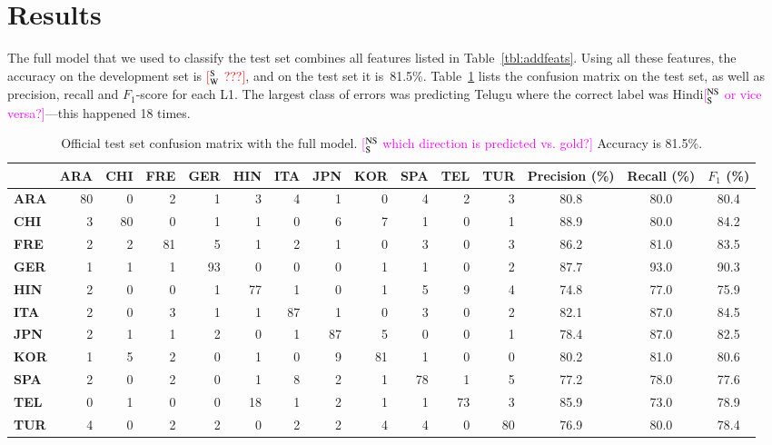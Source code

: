 \documentclass[11pt,letterpaper]{article}
\newcommand{\ensuretext}[1]{#1}
\newcommand{\nssmarker}{\ensuretext{\textcolor{magenta}{\ensuremath{^{\textsc{NS}}_{\textsc{S}}}}}}
\newcommand{\swmarker}{\ensuretext{\textcolor{red}{\ensuremath{^{\textsc{S}}_{\textsc{W}}}}}}
\newcommand{\arkcomment}[3]{\ensuretext{\textcolor{#3}{[#1 #2]}}}
\newcommand{\nss}[1]{\arkcomment{\nssmarker}{#1}{magenta}}
\newcommand{\sw}[1]{\arkcomment{\swmarker}{#1}{red}}
\newcommand{\Tref}[1]{Table~\ref{#1}}
\begin{document}
\section{Results}
\label{sec:results}
The full model that we used to classify the test set combines all
features listed in \Tref{tbl:addfeats}. Using all these features, the
accuracy on the development set is \sw{???}, and on the test set it
is~81.5\%. \Tref{tbl:matrix} lists the confusion matrix on the test
set, as well as precision, recall and $F_1$-score for each L1.
The largest class of errors was predicting Telugu where the correct label 
was Hindi\nss{or vice versa?}---this happened 18 times. 



\begin{table*}[hbt]
\small\centering
\begin{tabular}{>{\bf}l|r@{ }r@{ }r@{ }r@{ }r@{ }r@{ }r@{ }r@{ }r@{ }r@{ }r|ccc} %
	& \bf ARA & \bf CHI & \bf FRE & \bf GER & \bf HIN & \bf ITA & \bf JPN & \bf KOR & \bf SPA & \bf TEL & \bf TUR & \bf Precision (\%) & \bf Recall (\%) & \bf $F_1$ (\%) \\
\hline
ARA & 80 & 0 & 2 & 1 & 3 & 4 & 1 & 0 & 4 & 2 & 3 & 80.8 & 80.0 & 80.4 \\
CHI & 3 & 80 & 0 & 1 & 1 & 0 & 6 & 7 & 1 & 0 & 1 & 88.9 & 80.0 & 84.2 \\
FRE & 2 & 2 & 81 & 5 & 1 & 2 & 1 & 0 & 3 & 0 & 3 & 86.2 & 81.0 & 83.5 \\
\hline
GER & 1 & 1 & 1 & 93 & 0 & 0 & 0 & 1 & 1 & 0 & 2 & 87.7 & 93.0 & 90.3 \\
HIN & 2 & 0 & 0 & 1 & 77 & 1 & 0 & 1 & 5 & 9 & 4 & 74.8 & 77.0 & 75.9 \\
ITA & 2 & 0 & 3 & 1 & 1 & 87 & 1 & 0 & 3 & 0 & 2 & 82.1 & 87.0 & 84.5 \\
\hline
JPN & 2 & 1 & 1 & 2 & 0 & 1 & 87 & 5 & 0 & 0 & 1 & 78.4 & 87.0 & 82.5 \\
KOR & 1 & 5 & 2 & 0 & 1 & 0 & 9 & 81 & 1 & 0 & 0 & 80.2 & 81.0 & 80.6 \\
SPA & 2 & 0 & 2 & 0 & 1 & 8 & 2 & 1 & 78 & 1 & 5 & 77.2 & 78.0 & 77.6 \\
\hline
TEL & 0 & 1 & 0 & 0 & 18 & 1 & 2 & 1 & 1 & 73 & 3 & 85.9 & 73.0 & 78.9 \\
TUR & 4 & 0 & 2 & 2 & 0 & 2 & 2 & 4 & 4 & 0 & 80 & 76.9 & 80.0 & 78.4 \\
\end{tabular}
\caption{Official test set confusion matrix with the full model. \nss{which direction is predicted vs. gold?}
Accuracy is 81.5\%.}
\label{tbl:matrix}
\end{table*}
\end{document}
